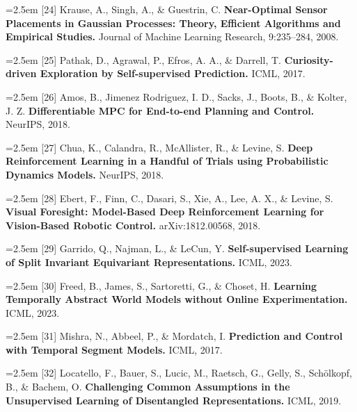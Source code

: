 \documentclass[11pt]{article}
\begin{document}
\noindent\hangindent=2.5em [24] Krause, A., Singh, A., \& Guestrin, C. \textbf{Near-Optimal Sensor Placements in Gaussian Processes: Theory, Efficient Algorithms and Empirical Studies.} Journal of Machine Learning Research, 9:235--284, 2008.\par

\noindent\hangindent=2.5em [25] Pathak, D., Agrawal, P., Efros, A. A., \& Darrell, T. \textbf{Curiosity-driven Exploration by Self-supervised Prediction.} ICML, 2017.\par

\noindent\hangindent=2.5em [26] Amos, B., Jimenez Rodriguez, I. D., Sacks, J., Boots, B., \& Kolter, J. Z. \textbf{Differentiable MPC for End-to-end Planning and Control.} NeurIPS, 2018.\par

\noindent\hangindent=2.5em [27] Chua, K., Calandra, R., McAllister, R., \& Levine, S. \textbf{Deep Reinforcement Learning in a Handful of Trials using Probabilistic Dynamics Models.} NeurIPS, 2018.\par

\noindent\hangindent=2.5em [28] Ebert, F., Finn, C., Dasari, S., Xie, A., Lee, A. X., \& Levine, S. \textbf{Visual Foresight: Model-Based Deep Reinforcement Learning for Vision-Based Robotic Control.} arXiv:1812.00568, 2018.\par

\noindent\hangindent=2.5em [29] Garrido, Q., Najman, L., \& LeCun, Y. \textbf{Self-supervised Learning of Split Invariant Equivariant Representations.} ICML, 2023.\par

\noindent\hangindent=2.5em [30] Freed, B., James, S., Sartoretti, G., \& Choset, H. \textbf{Learning Temporally Abstract World Models without Online Experimentation.} ICML, 2023.\par

\noindent\hangindent=2.5em [31] Mishra, N., Abbeel, P., \& Mordatch, I. \textbf{Prediction and Control with Temporal Segment Models.} ICML, 2017.\par

\noindent\hangindent=2.5em [32] Locatello, F., Bauer, S., Lucic, M., Raetsch, G., Gelly, S., Sch\"olkopf, B., \& Bachem, O. \textbf{Challenging Common Assumptions in the Unsupervised Learning of Disentangled Representations.} ICML, 2019.\par
\end{document}
